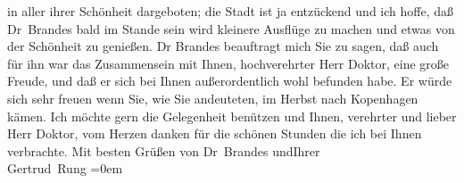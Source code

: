 \begin{ledgroupsized}[t]{13cm}
                    in aller ihrer Schönheit dargeboten; die Stadt ist ja entzückend und ich hoffe,
                    daß Dr Brandes bald im Stande sein wird
                    kleinere Ausflüge zu machen und etwas von der Schönheit zu genießen.\pend
           \pstart
           Dr Brandes beauftragt mich Sie {\pb}zu sagen, daß auch für ihn war das Zusammensein mit Ihnen, hochverehrter Herr
                    Doktor, eine große Freude, und daß er sich bei Ihnen außerordentlich wohl
                    befunden habe. Er würde sich sehr freuen wenn Sie, wie Sie andeuteten, im Herbst
                    nach Kopenhagen kämen.\pend
           \pstart
           Ich möchte gern die Gelegenheit benützen und Ihnen, verehrter und lieber Herr
                    Doktor, vom Herzen danken für die schönen Stunden die ich bei Ihnen
                    verbrachte.\pend
           \pstart
           Mit besten Grüßen von Dr Brandes
                        und\hspace*{2.5em}Ihrer{\\[\baselineskip]}\spacefill\mbox{Gertrud Rung}\pend
           \leftskip=0em{}\endnumbering{}\end{ledgroupsized}  \newcommand{\dateiname}{L02441}\newcommand{\titel}{Gertrud Rung an Arthur Schnitzler, 24. 5. 1925}\newcommand{\editorInnen}{Martin Anton Müller und Gerd-Hermann Susen}
      